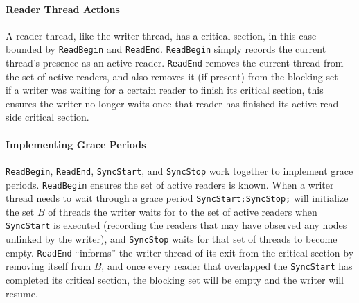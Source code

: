 \paragraph{Reader Thread Actions}
A reader thread, like the writer thread, has a critical section, in this case bounded by \lstinline|ReadBegin| and \lstinline|ReadEnd|.  \lstinline|ReadBegin| simply records the current thread's presence as an active reader.
\lstinline|ReadEnd| removes the current thread from the set of active readers, and also removes it (if present) from the blocking set --- if a writer was waiting for a certain reader to finish its critical section, this ensures the writer no longer waits once that reader has finished its active read-side critical section.
\paragraph{Implementing Grace Periods}
\lstinline|ReadBegin|, \lstinline|ReadEnd|, \lstinline|SyncStart|, and \lstinline|SyncStop| work together to implement grace periods.  \lstinline|ReadBegin| ensures the set of active readers is known.  When a writer thread needs to wait through a grace period \lstinline|SyncStart;SyncStop;| will initialize the set $B$ of threads the writer waits for to the set of active readers when \lstinline|SyncStart| is executed (recording the readers that may have observed any nodes unlinked by the writer), and \lstinline|SyncStop| waits for that set of threads to become empty.
\lstinline|ReadEnd| ``informs'' the writer thread of its exit from the critical section by removing itself from $B$, and once every reader that overlapped the \lstinline|SyncStart| has completed its critical section, the blocking set will be empty and the writer will resume.


